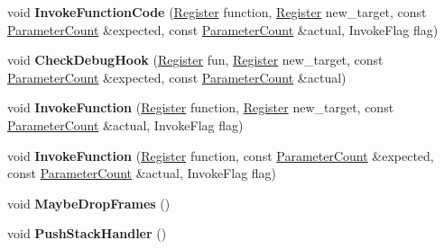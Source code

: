 \begin{DoxyCompactItemize}
void {\bfseries Invoke\+Function\+Code} (\mbox{\hyperlink{classv8_1_1internal_1_1Register}{Register}} function, \mbox{\hyperlink{classv8_1_1internal_1_1Register}{Register}} new\+\_\+target, const \mbox{\hyperlink{classv8_1_1internal_1_1ParameterCount}{Parameter\+Count}} \&expected, const \mbox{\hyperlink{classv8_1_1internal_1_1ParameterCount}{Parameter\+Count}} \&actual, Invoke\+Flag flag)
\item 
\mbox{\label{classv8_1_1internal_1_1MacroAssembler_a2cf2b9ab50d1b6efcd90587f2502451b}} 
void {\bfseries Check\+Debug\+Hook} (\mbox{\hyperlink{classv8_1_1internal_1_1Register}{Register}} fun, \mbox{\hyperlink{classv8_1_1internal_1_1Register}{Register}} new\+\_\+target, const \mbox{\hyperlink{classv8_1_1internal_1_1ParameterCount}{Parameter\+Count}} \&expected, const \mbox{\hyperlink{classv8_1_1internal_1_1ParameterCount}{Parameter\+Count}} \&actual)
\item 
\mbox{\label{classv8_1_1internal_1_1MacroAssembler_a9a69d864f46bb7b56e46d977b24a9fc4}} 
void {\bfseries Invoke\+Function} (\mbox{\hyperlink{classv8_1_1internal_1_1Register}{Register}} function, \mbox{\hyperlink{classv8_1_1internal_1_1Register}{Register}} new\+\_\+target, const \mbox{\hyperlink{classv8_1_1internal_1_1ParameterCount}{Parameter\+Count}} \&actual, Invoke\+Flag flag)
\item 
\mbox{\label{classv8_1_1internal_1_1MacroAssembler_ab075992a89587b70b074351e93c41bb8}} 
void {\bfseries Invoke\+Function} (\mbox{\hyperlink{classv8_1_1internal_1_1Register}{Register}} function, const \mbox{\hyperlink{classv8_1_1internal_1_1ParameterCount}{Parameter\+Count}} \&expected, const \mbox{\hyperlink{classv8_1_1internal_1_1ParameterCount}{Parameter\+Count}} \&actual, Invoke\+Flag flag)
\item 
\mbox{\label{classv8_1_1internal_1_1MacroAssembler_a24c22317b3c647e2829321dade36cf73}} 
void {\bfseries Maybe\+Drop\+Frames} ()
\item 
\mbox{\label{classv8_1_1internal_1_1MacroAssembler_af8ec8c2c3c525fa27b47125b8f2c90fb}} 
void {\bfseries Push\+Stack\+Handler} ()
\item 
\mbox{\label{classv8_1_1internal_1_1MacroAssembler_aaec1b780d52416c78d49b94483afa4f8}} 

\end{DoxyCompactItemize}
